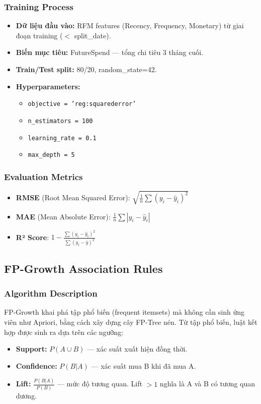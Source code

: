 \documentclass[a4paper,12pt]{article}
\begin{document}
\subsubsection{Training Process}
\begin{itemize}
    \item \textbf{Dữ liệu đầu vào:} RFM features (Recency, Frequency, Monetary) từ giai đoạn training ($<$ split\_date).
    \item \textbf{Biến mục tiêu:} FutureSpend — tổng chi tiêu 3 tháng cuối.
    \item \textbf{Train/Test split:} 80/20, random\_state=42.
    \item \textbf{Hyperparameters:}
    \begin{itemize}
        \item \texttt{objective = 'reg:squarederror'}
        \item \texttt{n\_estimators = 100}
        \item \texttt{learning\_rate = 0.1}
        \item \texttt{max\_depth = 5}
    \end{itemize}
\end{itemize}

\subsubsection{Evaluation Metrics}
\begin{itemize}
    \item \textbf{RMSE} (Root Mean Squared Error): $\sqrt{\frac{1}{n}\sum(y_i - \hat{y}_i)^2}$
    \item \textbf{MAE} (Mean Absolute Error): $\frac{1}{n}\sum|y_i - \hat{y}_i|$
    \item \textbf{R² Score}: $1 - \frac{\sum(y_i - \hat{y}_i)^2}{\sum(y_i - \bar{y})^2}$
\end{itemize}

\subsection{FP-Growth Association Rules}

\subsubsection{Algorithm Description}
FP-Growth khai phá tập phổ biến (frequent itemsets) mà không cần sinh ứng viên như Apriori, bằng cách xây dựng cây FP-Tree nén. Từ tập phổ biến, luật kết hợp được sinh ra dựa trên các ngưỡng:
\begin{itemize}
    \item \textbf{Support:} $P(A \cup B)$ — xác suất xuất hiện đồng thời.
    \item \textbf{Confidence:} $P(B|A)$ — xác suất mua B khi đã mua A.
    \item \textbf{Lift:} $\frac{P(B|A)}{P(B)}$ — mức độ tương quan. Lift $> 1$ nghĩa là A và B có tương quan dương.
\end{itemize}
\end{document}
